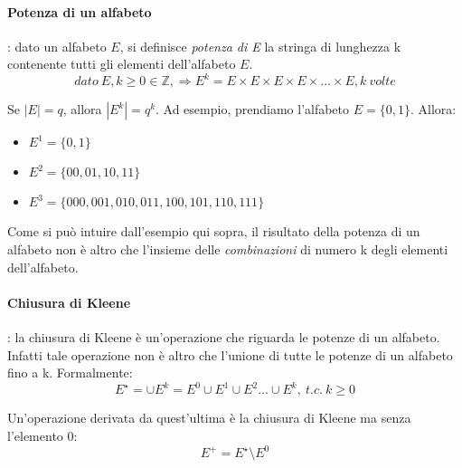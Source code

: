 \documentclass[11pt]{article}
\begin{document}
\paragraph{Potenza di un alfabeto}: dato un alfabeto $E$, si definisce \textit{potenza di E} la stringa di lunghezza k contenente tutti gli elementi dell'alfabeto $E$.
$$dato \medspace E, k \geq 0 \in \mathbb{Z}, \Rightarrow E^k = E\times E\times E\times E \times ... \times E, k \medspace volte$$

Se $|E| = q$, allora $|E^k| = q^k$. Ad esempio, prendiamo l'alfabeto $E=\{0,1\}$. Allora:
\begin{itemize}
	\item $E^1 = \{0,1\}$
	\item $E^2 = \{00,01,10,11\}$
	\item $E^3 = \{000,001,010,011,100,101,110,111\}$
\end{itemize}
Come si può intuire dall'esempio qui sopra, il risultato della potenza di un alfabeto non è altro che l'insieme delle \textit{combinazioni} di numero k degli elementi dell'alfabeto.

\paragraph{Chiusura di Kleene}: la chiusura di Kleene è un'operazione che riguarda
le potenze di un alfabeto. Infatti tale operazione non è altro che l'unione di
tutte le potenze di un alfabeto fino a k. Formalmente: $$E^{\star} = \cup E^k = E^0 \cup E^1 \cup E^2 ... \cup E^k, \medspace t.c. \medspace k\geq 0$$

Un'operazione derivata da quest'ultima è la chiusura di Kleene ma senza l'elemento 0: $$E^{+}=E^{\star}\setminus E^0$$
\end{document}
